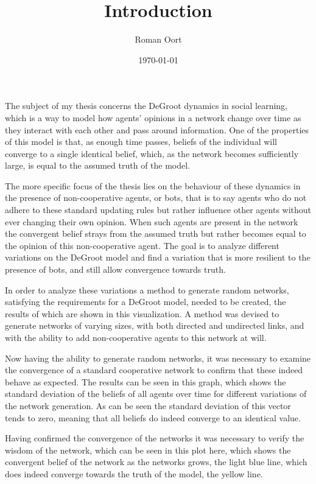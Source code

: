 \documentclass{article}
\title{Introduction}
\author{Roman Oort}
\date{\today}
\begin{document}
\maketitle

The subject of my thesis concerns the DeGroot dynamics in social learning, which is a way to model how agents' opinions in a network change over time as they interact with each other and pass around information. One of the properties of this model is that, as enough time passes, beliefs of the individual will converge to a single identical belief, which, as the network becomes sufficiently large, is equal to the assumed truth of the model.

The more specific focus of the thesis lies on the behaviour of these dynamics in the presence of non-cooperative agents, or bots, that is to say agents who do not adhere to these standard updating rules but rather influence other agents without ever changing their own opinion. When such agents are present in the network the convergent belief strays from the assumed truth but rather becomes equal to the opinion of this non-cooperative agent. The goal is to analyze different variations on the DeGroot model and find a variation that is more resilient to the presence of bots, and still allow convergence towards truth.

In order to analyze these variations a method to generate random networks, satisfying the requirements for a DeGroot model, needed to be created, the results of which are shown in this visualization. A method was devised to generate networks of varying sizes, with both directed and undirected links, and with the ability to add non-cooperative agents to this network at will.

Now having the ability to generate random networks, it was necessary to examine the convergence of a standard cooperative network to confirm that these indeed behave as expected. The results can be seen in this graph, which shows the standard deviation of the beliefs of all agents over time for different variations of the network generation. As can be seen the standard deviation of this vector tends to zero, meaning that all beliefs do indeed converge to an identical value.

Having confirmed the convergence of the networks it was necessary to verify the wisdom of the network, which can be seen in this plot here, which shows the convergent belief of the network as the networks grows, the light blue line, which does indeed converge towards the truth of the model, the yellow line.
\end{document}
